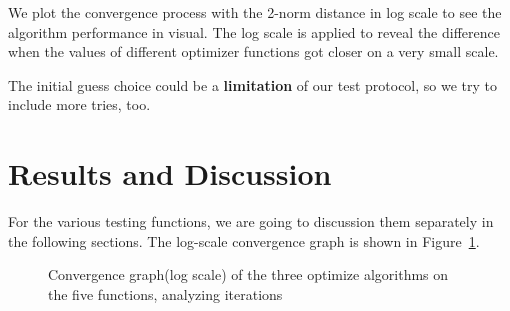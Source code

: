 \documentclass[12pt]{article}
\begin{document}
We plot the convergence process with the 2-norm distance in log scale to see the algorithm performance in visual. The log scale is applied to reveal the difference when the values of different optimizer functions got closer on a very small scale. 

The initial guess choice could be a \textbf{limitation} of our test protocol, so we try to include more tries, too.

\section{Results and Discussion}

For the various testing functions, we are going to discussion them separately in the following sections. The log-scale convergence graph is shown in Figure~\ref{fig:convgraph}.

\begin{figure}[ht]
\centering
{}
\caption[]{Convergence graph(log scale) of the three optimize algorithms on the five functions, analyzing iterations}
\label{fig:convgraph}
\end{figure}
\end{document}
